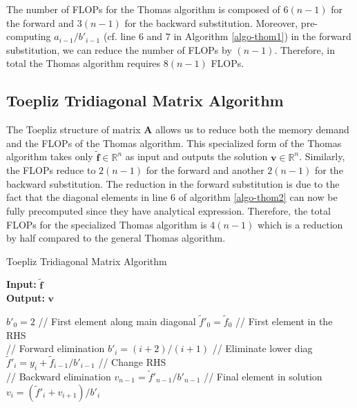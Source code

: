 \documentclass[a4paper]{article}
\begin{document}
The number of FLOPs for the Thomas algorithm is composed of $6(n-1)$ for the forward and $3(n-1)$ for the backward substitution. Moreover, pre-computing $a_{i-1}/b'_{i-1}$ (cf. line $6$ and $7$ in Algorithm \ref{algo-thom1}) in the forward substitution, we can reduce the number of FLOPs by $(n-1)$. Therefore, in total the Thomas algorithm requires $8(n-1)$ FLOPs.

\subsection{Toepliz Tridiagonal Matrix Algorithm}
The Toepliz structure of matrix $\mathbf{A}$ allows us to reduce both the memory demand and the FLOPs of the Thomas algorithm. This specialized form of the Thomas algorithm takes only $\mathbf{\tilde{f}}\in\mathbb{R}^{n}$ as input and outputs the solution $\mathbf{v}\in\mathbb{R}^{n}$. Similarly, the FLOPs reduce to $2(n-1)$ for the forward and another $2(n-1)$ for the backward substitution. The reduction in the forward substitution is due to the fact that the diagonal elements in line $6$ of algorithm \ref{algo-thom2} can now be fully precomputed since they have analytical expression. Therefore, the total FLOPs for the specialized Thomas algorithm is $4(n-1)$ which is a reduction by half compared to the general Thomas algorithm. 

\begin{algorithm}[H]
\caption{Toepliz Tridiagonal Matrix Algorithm}\label{algo-thom2}
\textbf{Input:} $\mathbf{\tilde{f}}$ \\
\textbf{Output:} $\mathbf{v}$
\begin{algorithmic}[1]
\State $b'_0=2$ \qquad// First element along main diagonal
\State $\tilde{f}'_0=\tilde{f}_0$ \qquad// First element in the RHS\\ 

    \State // Forward elimination
		\State $b'_i=(i+2)/(i+1)$ \qquad// Eliminate lower diag
		\State $\tilde{f}'_i=y_i+\tilde{f}_{i-1}/b'_{i-1}$ \qquad// Change RHS
	\EndFor \\
    \State // Backward elimination
    \State $v_{n-1}=\tilde{f}'_{n-1}/b'_{n-1}$ \qquad\qquad// Final element in solution
		\State $v_i=(\tilde{f}'_{i}+v_{i+1})/b'_i$ 
	\EndFor
\end{algorithmic}
\end{algorithm}
\end{document}
